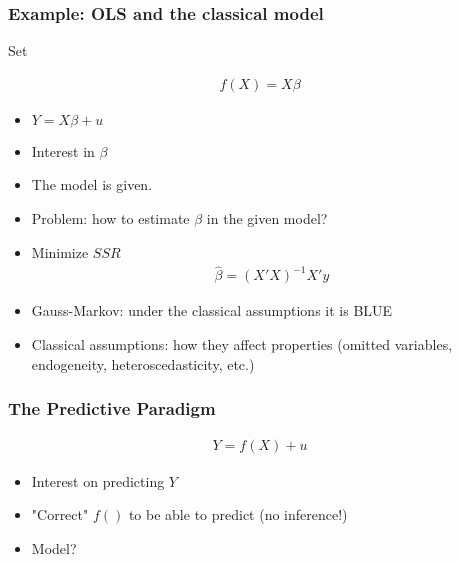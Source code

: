 \documentclass[
  shownotes,
  xcolor={svgnames},
  hyperref={colorlinks,citecolor=DarkBlue,linkcolor=DarkRed,urlcolor=DarkBlue}
  ]{beamer}
\begin{document}
\begin{frame}
\frametitle{Example: OLS and the classical model}

Set 

\begin{align}
f(X)=X\beta
\end{align}

\begin{itemize}
    \item $Y=X\beta+u$ 
    \item Interest in $\beta$

    \item The model is given. 
    \item Problem: how to estimate $\beta$ in the given model?
    \item Minimize $SSR$
      \begin{align}
          \hat \beta= (X'X)^{-1} X'y
      \end{align}


    \item Gauss-Markov: under the classical assumptions it is BLUE

    \item Classical assumptions: how they affect properties (omitted variables, endogeneity, heteroscedasticity, etc.)
\end{itemize}

\end{frame}


\begin{frame}
\frametitle{The Predictive Paradigm}


\begin{align}
Y=f(X)+u
\end{align}

\begin{itemize}
  \item Interest on predicting $Y$
  \medskip
  \item "Correct" $f()$ to be able to predict (no inference!)
  \medskip
  \item Model? 
  
\end{itemize}


\end{frame}


\end{document}
